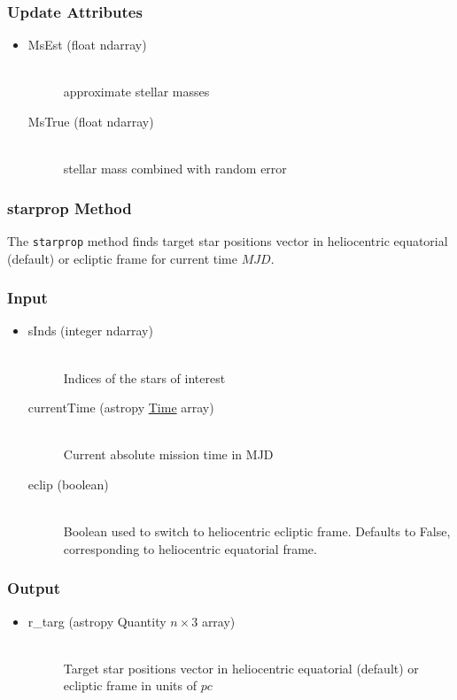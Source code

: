 \documentclass[cleanfoot]{asme2ej}
\begin{document}
\subsubsection*{Update Attributes}
\begin{itemize}
\item
\begin{description}
    \item[MsEst (float ndarray)] \hfill \\ approximate stellar masses
    \item[MsTrue (float ndarray)] \hfill \\ stellar mass combined with random error
\end{description}
\end{itemize}

\subsubsection{starprop Method} \label{sec:starproptask}
The \verb+starprop+ method finds target star positions vector in heliocentric equatorial (default) or ecliptic frame for current time $MJD$.
\subsubsection*{Input}
\begin{itemize}
\item 
\begin{description}
    \item[sInds (integer ndarray)] \hfill \\ Indices of the stars of interest
    \item[currentTime (astropy \href{http://astropy.readthedocs.org/en/latest/time/index.html}{Time} array)] \hfill \\ Current absolute mission time in MJD
    \item[eclip (boolean)] \hfill \\ Boolean used to switch to heliocentric ecliptic frame. Defaults to False, corresponding to heliocentric equatorial frame.
\end{description}
\end{itemize}
\subsubsection*{Output}
\begin{itemize}
\item
\begin{description}
    \item[r\_targ (astropy Quantity $n\times3$ array)] \hfill \\ Target star positions vector in heliocentric equatorial (default) or ecliptic frame in units of $pc$
\end{description}
\end{itemize}
\end{document}
